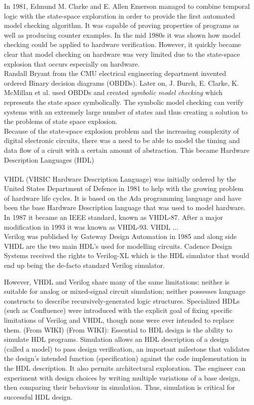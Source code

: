 In 1981, Edmund M. Clarke and E. Allen Emerson managed to combine temporal logic with the state-space exploration in order to provide the first automated model checking algorithm\cite{Clarke1981}. It was capable of proving properties of programs as well as producing counter examples.
In the mid 1980s it was shown how model checking could be applied to hardware verification. However, it quickly became clear that model checking on hardware was very limited due to the state-space explosion that occurs especially on hardware. \\
Randall Bryant from the CMU electrical engineering department invented ordered Binary decision diagrams (OBDDs). Later on, J. Burch, E. Clarke, K. McMillan et al.\cite{Burch1992} used OBDDs and created \textit{symbolic model checking} which represents the state space symbolically. The symbolic model checking can verify systems with an extremely large number of states and thus creating a solution to the problems of state space explosion.\\
Because of the state-space explosion problem and the increasing complexity of digital electronic circuits, there was a need to be able to model the timing and data flow of a ciruit with a certain amount of abstraction. This became Hardware Description Languages (HDL) \\\\
VHDL (VHSIC Hardware Description Language) was initially ordered by the United States Department of Defence in 1981 to help with the growing problem of hardware life cycles. It is based on the Ada programming language and have been the base Hardware Description language that was used to model hardware. In 1987 it became an IEEE standard, known as VHDL-87. After a major modification in 1993 it was known as VHDL-93. VHDL ...
\\

Verilog was published by Gateway Design Automation in 1985 and along side VHDL are the two main HDL's used for modelling circuits. Cadence Design Systems received the rights to Verilog-XL which is the HDL simulator that would end up being the de-facto standard Verilog simulator.


However, VHDL and Verilog share many of the same limitations: neither is suitable for analog or mixed-signal circuit simulation; neither possesses language constructs to describe recursively-generated logic structures. Specialized HDLs (such as Confluence) were introduced with the explicit goal of fixing specific limitations of Verilog and VHDL, though none were ever intended to replace them. (From WIKI)
(From WIKI): Essential to HDL design is the ability to simulate HDL programs. Simulation allows an HDL description of a design (called a model) to pass design verification, an important milestone that validates the design's intended function (specification) against the code implementation in the HDL description. It also permits architectural exploration. The engineer can experiment with design choices by writing multiple variations of a base design, then comparing their behaviour in simulation. Thus, simulation is critical for successful HDL design.


